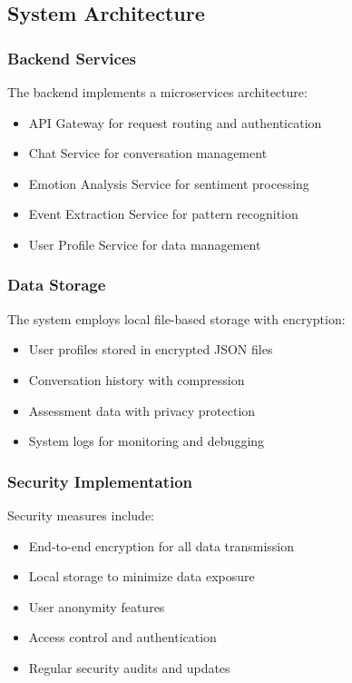 \subsection{System Architecture}

\subsubsection{Backend Services}

The backend implements a microservices architecture:

\begin{itemize}
    \item API Gateway for request routing and authentication
    \item Chat Service for conversation management
    \item Emotion Analysis Service for sentiment processing
    \item Event Extraction Service for pattern recognition
    \item User Profile Service for data management
\end{itemize}

\subsubsection{Data Storage}

The system employs local file-based storage with encryption:

\begin{itemize}
    \item User profiles stored in encrypted JSON files
    \item Conversation history with compression
    \item Assessment data with privacy protection
    \item System logs for monitoring and debugging
\end{itemize}

\subsubsection{Security Implementation}

Security measures include:

\begin{itemize}
    \item End-to-end encryption for all data transmission
    \item Local storage to minimize data exposure
    \item User anonymity features
    \item Access control and authentication
    \item Regular security audits and updates
\end{itemize}

